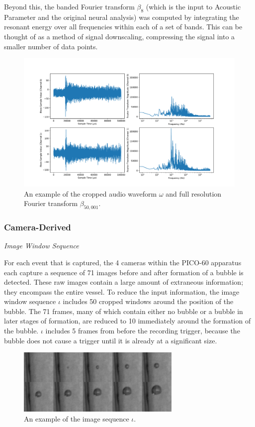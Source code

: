 \documentclass[10pt]{article}
\begin{document}
Beyond this, the banded Fourier transform $\beta_{8}$ (which is the input to Acoustic Parameter and the original neural analysis) was computed by integrating the resonant energy over all frequencies within each of a set of bands. This can be thought of as a method of signal downscaling, compressing the signal into a smaller number of data points.

\begin{figure}[h]
    \centering
    \includegraphics[width=\textwidth]{audio}
    \caption{\label{} An example of the cropped audio waveform $\omega$ and full resolution Fourier transform $\beta_{50,001}$.}
\end{figure}

\subsubsection{Camera-Derived}

\textit{Image Window Sequence}

For each event that is captured, the 4 cameras within the PICO-60 apparatus each capture a sequence of 71 images before and after formation of a bubble is detected. These raw images contain a large amount of extraneous information; they encompass the entire vessel. To reduce the input information, the image window sequence $\iota$ includes 50 cropped windows around the position of the bubble. The 71 frames, many of which contain either no bubble or a bubble in later stages of formation, are reduced to 10 immediately around the formation of the bubble. $\iota$ includes 5 frames from before the recording trigger, because the bubble does not cause a trigger until it is already at a significant size.

\begin{figure}[h]
    \centering
    \includegraphics[width=0.7\textwidth]{image_grid}
    \caption{\label{} An example of the image sequence $\iota$.}
\end{figure}
\end{document}
